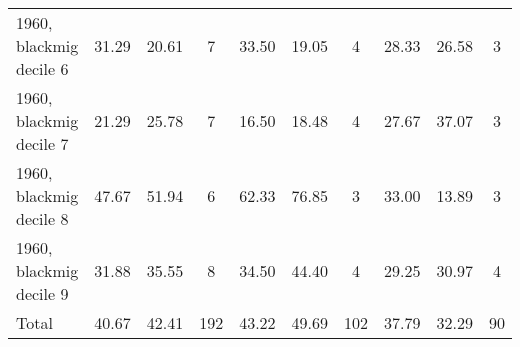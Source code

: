 \begin{table}[htbp]
\begin{tabular}{l*{3}{ccc}}
1960, blackmig decile 6&       31.29&       20.61&           7&       33.50&       19.05&           4&       28.33&       26.58&           3\\
1960, blackmig decile 7&       21.29&       25.78&           7&       16.50&       18.48&           4&       27.67&       37.07&           3\\
1960, blackmig decile 8&       47.67&       51.94&           6&       62.33&       76.85&           3&       33.00&       13.89&           3\\
1960, blackmig decile 9&       31.88&       35.55&           8&       34.50&       44.40&           4&       29.25&       30.97&           4\\
Total               &       40.67&       42.41&         192&       43.22&       49.69&         102&       37.79&       32.29&          90\\
\bottomrule
\end{tabular}
\end{table}

